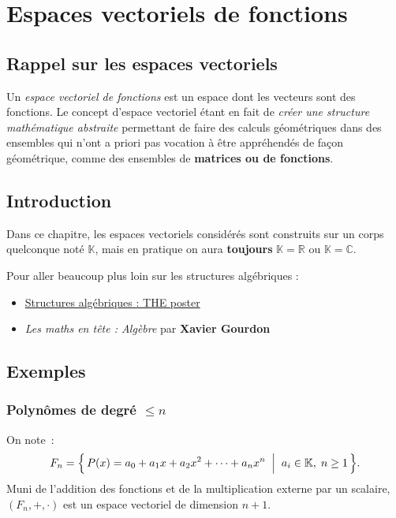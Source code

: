 \chapter{Espaces vectoriels de fonctions} \label{chap:evf}

\section{Rappel sur les espaces vectoriels}
Un \emph{espace vectoriel de fonctions} est un espace dont les
vecteurs sont des fonctions. Le concept d'espace vectoriel étant en
fait de \emph{créer une structure mathématique abstraite} permettant de
faire des calculs géométriques dans des ensembles qui n'ont a priori
pas vocation à être appréhendés de façon géométrique, comme des
ensembles de \textbf{matrices ou de fonctions}.

\section{Introduction}
Dans ce chapitre, les espaces vectoriels considérés sont construits
sur un corps quelconque not\'e $\mathbb{K}$, mais en pratique on aura
\textbf{toujours} $\mathbb{K}=\mathbb{R}$ ou $\mathbb{K}=\mathbb{C}$.

\begin{Note}
	Pour aller beaucoup plus loin sur les structures alg\'ebriques :
	\begin{itemize}
		\item \href{https://rancune.org/sciences/2022/03/23/structures-algebriques.html}{Structures algébriques : THE poster}
		\item \emph{Les maths en tête : Algèbre} par \textbf{Xavier Gourdon}\Cite{Gourdon-algebre}
	\end{itemize}
\end{Note}

\section{Exemples}

\subsection{Polynômes de degré $\leq n$}
On note~:
\[
  F_n = \Bigl\{\, P(x) = a_0 + a_1 x + a_2 x^2 + \cdots + a_n x^n
  \;\Bigm|\; a_i \in \mathbb{K},\; n \geq 1 \,\Bigr\}.
\]
Muni de l’addition des fonctions et de la multiplication externe par
un scalaire,
$(F_n,+,\cdot)$ est un espace vectoriel de dimension $n+1$.

